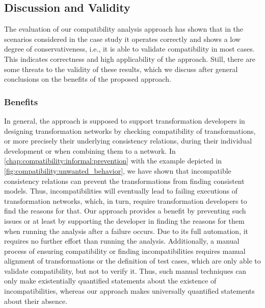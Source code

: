 \subsection{Discussion and Validity}

The evaluation of our compatibility analysis approach has shown that in the scenarios considered in the case study it operates correctly and shows a low degree of conservativeness, i.e., it is able to validate compatibility in most cases.
This indicates correctness and high applicability of the approach.
Still, there are some threats to the validity of these results, which we discuss after general conclusions on the benefits of the proposed approach.

\subsubsection{Benefits}

In general, the approach is supposed to support transformation developers in designing transformation networks by checking compatibility of transformations, or more precisely their underlying consistency relations, during their individual development or when combining them to a network.
In \autoref{chap:compatibility:informal:prevention} with the example depicted in \autoref{fig:compatibility:unwanted_behavior}, we have shown that incompatible consistency relations can prevent the transformations from finding consistent models.
Thus, incompatibilities will eventually lead to failing executions of transformation networks, which, in turn, require transformation developers to find the reasons for that.
Our approach provides a benefit by preventing such issues or at least by supporting the developer in finding the reasons for them when running the analysis after a failure occurs.
Due to its full automation, it requires no further effort than running the analysis.
Additionally, a manual process of ensuring compatibility or finding incompatibilities requires manual alignment of transformations or the definition of test cases, which are only able to validate compatibility, but not to verify it.
Thus, such manual techniques can only make existentially quantified statements about the existence of incompatibilities, whereas our approach makes universally quantified statements about their absence.

